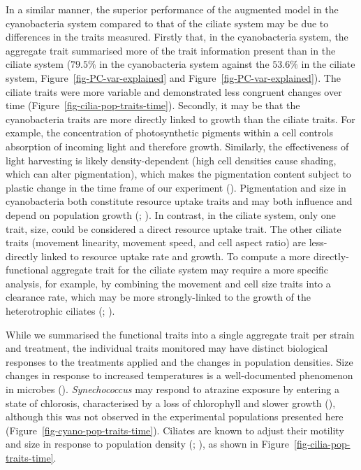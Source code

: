 \documentclass[
  letterpaper,
  DIV=11,
  numbers=noendperiod]{scrartcl}
\begin{document}
In a similar manner, the superior performance of the augmented model in
the cyanobacteria system compared to that of the ciliate system may be
due to differences in the traits measured. Firstly that, in the
cyanobacteria system, the aggregate trait summarised more of the trait
information present than in the ciliate system (\(79.5\%\) in the
cyanobacteria system against the \(53.6\%\) in the ciliate system,
Figure~\ref{fig-PC-var-explained} and
Figure~\ref{fig-PC-var-explained}). The ciliate traits were more
variable and demonstrated less congruent changes over time
(Figure~\ref{fig-cilia-pop-traits-time}). Secondly, it may be that the
cyanobacteria traits are more directly linked to growth than the ciliate
traits. For example, the concentration of photosynthetic pigments within
a cell controls absorption of incoming light and therefore growth.
Similarly, the effectiveness of light harvesting is likely
density-dependent (high cell densities cause shading, which can alter
pigmentation), which makes the pigmentation content subject to plastic
change in the time frame of our experiment
(). Pigmentation and size in
cyanobacteria both constitute resource uptake traits and may both
influence and depend on population growth
(;
). In contrast, in the
ciliate system, only one trait, size, could be considered a direct
resource uptake trait. The other ciliate traits (movement linearity,
movement speed, and cell aspect ratio) are less-directly linked to
resource uptake rate and growth. To compute a more directly-functional
aggregate trait for the ciliate system may require a more specific
analysis, for example, by combining the movement and cell size traits
into a clearance rate, which may be more strongly-linked to the growth
of the heterotrophic ciliates (; ).

While we summarised the functional traits into a single aggregate trait
per strain and treatment, the individual traits monitored may have
distinct biological responses to the treatments applied and the changes
in population densities. Size changes in response to increased
temperatures is a well-documented phenomenon in microbes
(). \emph{Synechococcus}
may respond to atrazine exposure by entering a state of chlorosis,
characterised by a loss of chlorophyll and slower growth
(),
although this was not observed in the experimental populations presented
here (Figure~\ref{fig-cyano-pop-traits-time}). Ciliates are known to
adjust their motility and size in response to population density
(;
), as shown in
Figure~\ref{fig-cilia-pop-traits-time}.
\end{document}
